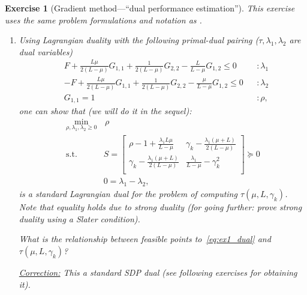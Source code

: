 \documentclass[11pt,a4paper]{article}
\newcommand{\correction}[1]{{{\color{blue}\underline{Correction:} #1}}}
\newcommand{\correction}[1]{}
\newtheorem{exercise}{Exercise}
\begin{document}
	\begin{exercise}[Gradient method---``dual performance estimation'']\label{ex2} This exercise uses the same problem formulations and notation as .
	\begin{enumerate}
		\item Using Lagrangian duality with the following primal-dual pairing ($\tau,\lambda_1,\lambda_2$ are dual variables)
	\begin{equation}\label{eq:ex2:assign_dual}
			\begin{aligned}
			& F + \tfrac{L\mu}{2(L-\mu)} G_{1,1}+\tfrac{1}{2(L-\mu)}G_{2,2}-\tfrac{L}{L-\mu}G_{1,2}\leqslant 0&&:\lambda_1\\
			&-F + \tfrac{L\mu}{2(L-\mu)} G_{1,1}+\tfrac{1}{2(L-\mu)}G_{2,2}-\tfrac{\mu}{L-\mu}G_{1,2}\leqslant 0&&:\lambda_2\\
			&G_{1,1}= 1&&:\rho,
			\end{aligned}
			\end{equation}
one can show that (we will do it in the sequel):
		\begin{equation}\label{eq:ex1_dual}	 
		\begin{aligned}
			\min_{\rho,\lambda_1,\lambda_2\geqslant 0} & \,\rho\\
			\text{s.t. }& S=\begin{bmatrix}
				\rho-1+\frac{\lambda_1 L\mu}{L-\mu } & \gamma_k-\frac{\lambda_1 (\mu +L)}{2 (L-\mu )} \\
				\gamma_k-\frac{\lambda_1 (\mu +L)}{2 (L-\mu )} & \frac{\lambda_1}{L-\mu }-\gamma_k^2 \\
			\end{bmatrix}\succcurlyeq 0\\
			&0=\lambda_1-\lambda_2,
		\end{aligned}
		\end{equation}
is a standard Lagrangian dual for the problem of computing $\tau(\mu,L,\gamma_k)$. Note that equality holds due to strong duality (for going further: prove strong duality using a Slater condition). 
	
	What is the relationship between feasible points to~\eqref{eq:ex1_dual} and $\tau(\mu,L,\gamma_k)$?
	
	\correction{This a standard SDP dual (see following exercises for obtaining it).
	
}
\end{enumerate}
\end{exercise}
\end{document}
